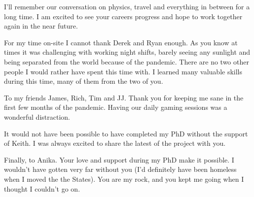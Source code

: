 \begin{SingleSpace}
I'll remember our conversation on physics, travel and everything in between for a long time. 
I am excited to see your careers progress and hope to work together again in the near future.
\par
For my time on-site I cannot thank Derek and Ryan enough. As you know at times it was challenging with working night shifts, barely seeing any sunlight and being separated from the world because of the pandemic. There are no two other people I would rather have spent this time with. I learned many valuable skills during this time, many of them from the two of you. 
\par
To my friends James, Rich, Tim and JJ.
Thank you for keeping me sane in the first few months of the pandemic.
Having our daily gaming sessions was a wonderful distraction.
\par
It would not have been possible to have completed my PhD without the support of Keith.
I was always excited to share the latest of the project with you.
\par
Finally, to Anika.
Your love and support during my PhD make it possible.
I wouldn't have gotten very far without you (I'd definitely have been homeless when I moved the the States).
You are my rock, and you kept me going when I thought I couldn't go on.
\end{SingleSpace}
\clearpage
